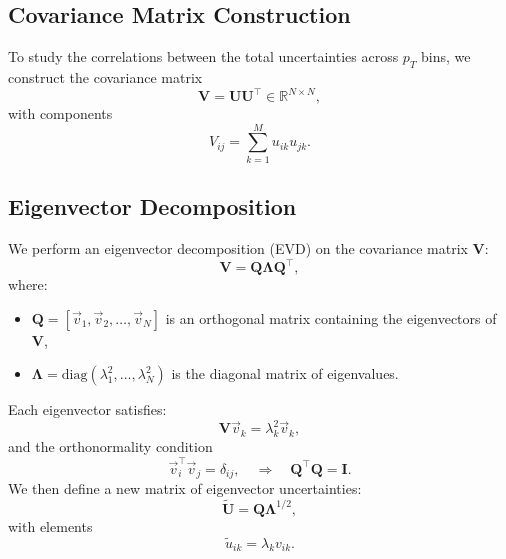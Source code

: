 \subsection*{Covariance Matrix Construction}
To study the correlations between the total uncertainties across $p_T$ bins, we construct the covariance matrix
\begin{equation*}
\mathbf{V} = \mathbf{U} \mathbf{U}^\top \in \mathbb{R}^{N \times N},
\end{equation*}
with components
\begin{equation*}
V_{ij} = \sum_{k=1}^{M} u_{ik} u_{jk}.
\end{equation*}
\subsection*{Eigenvector Decomposition}
We perform an eigenvector decomposition (EVD) on the covariance matrix $\mathbf{V}$:
\begin{equation*}
\mathbf{V} = \mathbf{Q} \boldsymbol{\Lambda} \mathbf{Q}^\top,
\end{equation*}
where:
\begin{itemize}
    \item $\mathbf{Q} = [\vec{v}_1, \vec{v}_2, \dots, \vec{v}_N]$ is an orthogonal matrix containing the eigenvectors of $\mathbf{V}$,
    \item $\boldsymbol{\Lambda} = \mathrm{diag}(\lambda_1^2, \dots, \lambda_N^2)$ is the diagonal matrix of eigenvalues.
\end{itemize}
Each eigenvector satisfies:
\begin{equation*}
\mathbf{V} \vec{v}_k = \lambda_k^2 \vec{v}_k,
\end{equation*}
and the orthonormality condition
\begin{equation*}
\vec{v}_i^\top \vec{v}_j = \delta_{ij}, \quad \Rightarrow \quad \mathbf{Q}^\top \mathbf{Q} = \mathbf{I}.
\end{equation*}
We then define a new matrix of eigenvector uncertainties:
\begin{equation*}
\tilde{\mathbf{U}} = \mathbf{Q} \boldsymbol{\Lambda}^{1/2},
\end{equation*}
with elements
\begin{equation*}
\tilde{u}_{ik} = \lambda_k v_{ik}.
\end{equation*}
